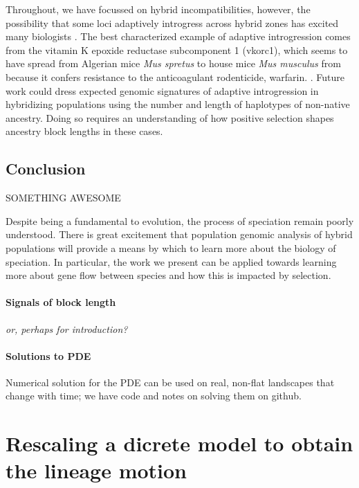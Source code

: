 \documentclass[11pt,letterpaper]{article}
\newcommand{\plr}[1]{{\em \color{blue} #1}}
\begin{document}
Throughout, we have focussed on hybrid incompatibilities, however, the possibility that some loci adaptively introgress across hybrid zones has excited many biologists \citep{Arnold2004}.   
The best characterized example of adaptive introgression comes from the vitamin K epoxide reductase subcomponent 1 (vkorc1), which seems to have spread from Algerian mice \emph{Mus spretus} to house mice \emph{Mus musculus} from because it confers resistance to the anticoagulant rodenticide, warfarin. \citep{Song2011}. 
Future work could dress expected genomic signatures of adaptive introgression in hybridizing populations using the number and length of haplotypes of non-native ancestry. 
Doing so requires an understanding of how positive selection shapes ancestry block lengths in these cases. 


\subsection*{Conclusion}
SOMETHING AWESOME

Despite being a fundamental to evolution, the process of speciation remain poorly understood. There is great excitement that population genomic analysis of hybrid populations will provide a means by which to learn more about the biology of speciation. In particular, the work we present can be applied towards learning more about gene flow between species and how this is impacted by selection.  



\paragraph{Signals of block length}

\plr{or, perhaps for introduction?}



\paragraph{Solutions to PDE}
Numerical solution for the PDE can be used on real, non-flat landscapes that change with time;
we have code and notes on solving them on github.




\appendix

\section{Rescaling a dicrete model to obtain the lineage motion}
\label{apx:lineage_derivation}
\end{document}
